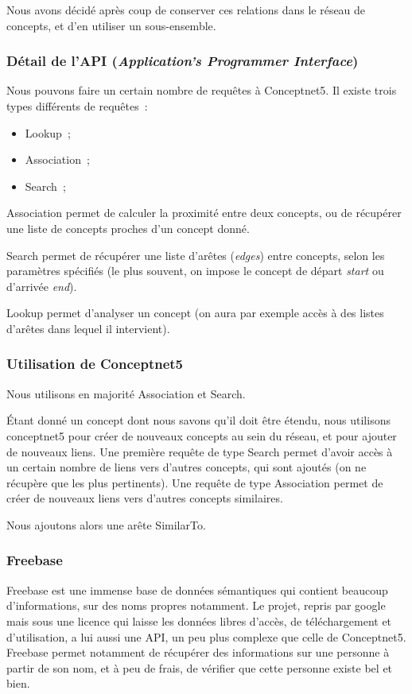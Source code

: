 \documentclass[a4paper, 12pt]{article}
\newcommand{\ang}[1]{\textit{#1}}%
\begin{document}
Nous avons décidé après coup de conserver ces relations dans le réseau de concepts, et d'en utiliser un sous-ensemble.

\subsubsection{Détail de l'API (\ang{Application's Programmer Interface})}

Nous pouvons faire un certain nombre de requêtes à Conceptnet5. Il existe trois types différents de requêtes~:
\begin{itemize}
 \item Lookup~;
 \item Association~;
 \item Search~;
\end{itemize}
Association permet de calculer la proximité entre deux concepts, ou de récupérer une liste de concepts proches d'un concept donné.

Search permet de récupérer une liste d'arêtes (\ang{edges}) entre concepts, selon les paramètres spécifiés (le plus souvent, on impose le concept de départ \ang{start} ou d'arrivée \ang{end}).

Lookup permet d'analyser un concept (on aura par exemple accès à des listes d'arêtes dans lequel il intervient).


\subsubsection{Utilisation de Conceptnet5}

Nous utilisons en majorité Association et Search.

Étant donné un concept dont nous savons qu'il doit être étendu, nous utilisons conceptnet5 pour créer de nouveaux concepts au sein du réseau, et pour ajouter de nouveaux liens. Une première requête de type Search permet d'avoir accès à un certain nombre de liens vers d'autres concepts, qui sont ajoutés (on ne récupère que les plus pertinents). Une requête de type Association permet de créer de nouveaux liens vers d'autres concepts similaires.

Nous ajoutons alors une arête SimilarTo.

\subsubsection{Freebase}

Freebase est une immense base de données sémantiques qui contient beaucoup d'informations, sur des noms propres notamment. Le projet, repris par google mais sous une licence qui laisse les données libres d'accès, de téléchargement et d'utilisation, a lui aussi une API, un peu plus complexe que celle de Conceptnet5. Freebase permet notamment de récupérer des informations sur une personne à partir de son nom, et à peu de frais, de vérifier que cette personne existe bel et bien.
\end{document}
